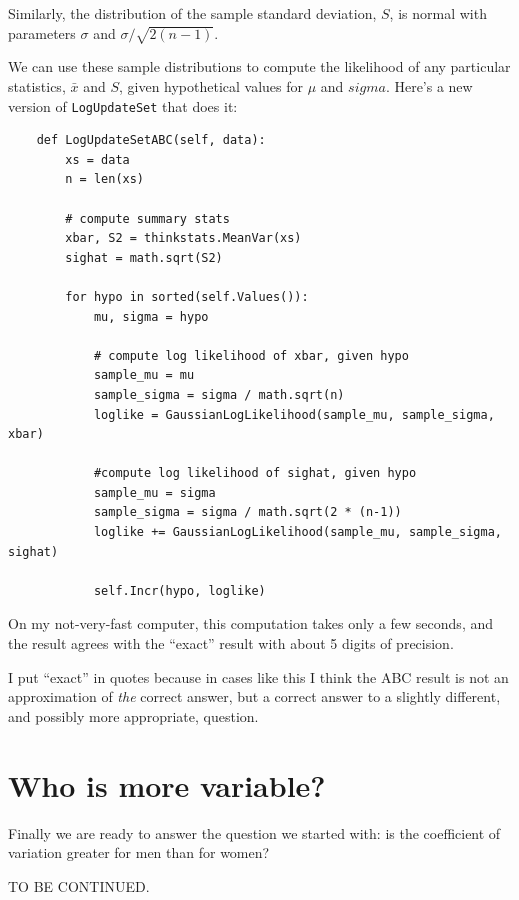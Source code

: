 \documentclass[12pt]{book}
\begin{document}
Similarly, the distribution of the sample standard deviation, $S$, is normal
with parameters $\sigma$ and $\sigma / \sqrt{2 (n-1)}$.

We can use these sample distributions to compute the likelihood
of any particular statistics, $\bar{x}$ and $S$, given hypothetical values
for $\mu$ and $sigma$.  Here's a new version of \verb"LogUpdateSet"
that does it:

\begin{verbatim}
    def LogUpdateSetABC(self, data):
        xs = data
        n = len(xs)

        # compute summary stats
        xbar, S2 = thinkstats.MeanVar(xs)
        sighat = math.sqrt(S2)

        for hypo in sorted(self.Values()):
            mu, sigma = hypo

            # compute log likelihood of xbar, given hypo
            sample_mu = mu
            sample_sigma = sigma / math.sqrt(n)
            loglike = GaussianLogLikelihood(sample_mu, sample_sigma, xbar)

            #compute log likelihood of sighat, given hypo
            sample_mu = sigma
            sample_sigma = sigma / math.sqrt(2 * (n-1))
            loglike += GaussianLogLikelihood(sample_mu, sample_sigma, sighat)

            self.Incr(hypo, loglike)
\end{verbatim}

On my not-very-fast computer, this computation takes only a few seconds,
and the result agrees with the ``exact'' result with about 5 digits of
precision.

I put ``exact'' in quotes because in cases like this I think the ABC
result is not an approximation of {\em the} correct answer, but a
correct answer to a slightly different, and possibly more appropriate,
question.


\section{Who is more variable?}

Finally we are ready to answer the question we started with: is the
coefficient of variation greater for men than for women?

TO BE CONTINUED.
\begin{verbatim}
\end{verbatim}

\begin{verbatim}
\end{verbatim}
\end{document}
